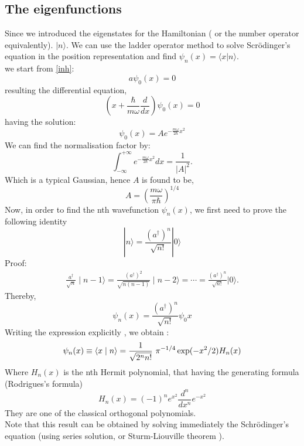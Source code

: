 \subsection{The eigenfunctions}
Since we introduced the eigenstates for the Hamiltonian ( or the number operator equivalently). $ | n\rangle$. We can use the ladder operator method to solve Scr\"{o}dinger's equation in the position representation and find $ \psi_n(x) = \langle x| n\rangle$. \\ we start from \eqref{inh}:
\begin{equation}
a \psi_0(x) =0
\end{equation}
resulting the differential equation,
\begin{equation}
\left( x+\frac{\hbar}{m \omega} \frac{d}{dx}\right)  \psi_0(x) =0
\end{equation}
having the solution:
\begin{equation}
\psi_0(x) = A e^{-\frac{m \omega}{2 \hbar} x^2}
\end{equation}
We can find the normalisation factor by:
\begin{equation}
\int_{- \infty}^{+ \infty} e^{-\frac{m \omega}{2 \hbar} x^2} dx = \frac{1}{|A|^2}.
\end{equation}
Which is a typical Gaussian, hence $A$ is found to be,
\begin{equation}
A= \left( \frac{m \omega}{\pi \hbar}\right) ^ {1/4}
\end{equation} 
Now, in order to find the nth wavefunction $ \psi_n(x)$, we first need to prove the following identity
\begin{equation}
| n\rangle = \frac{ (a^\dagger)^n}{\sqrt{n !}} | 0\rangle
\end{equation}
Proof:
\begin{align*}
\frac{a^\dagger}{\sqrt{n}} \mid n - 1 \rangle = \frac{(a^\dagger)^2}{\sqrt{n(n - 1)}}\mid n - 2 \rangle = \cdots = \frac{(a^\dagger)^n}{\sqrt{n!}}|0\rangle.
\end{align*}
Thereby, 
\begin{equation}
\psi_n(x) = \frac{ (a^\dagger)^n}{\sqrt{n !}} \psi_0{x}
\end{equation}
Writing the expression explicitly , we obtain :
\begin{equation}
\psi_n(x)\equiv \left\langle x \mid n \right\rangle = {1 \over \sqrt{2^n n!}}~ \pi^{-1/4} \exp(-x^2 / 2) H_n(x)
\end{equation}
Where $ H_n(x)$ is the nth Hermit polynomial, that having the generating formula (Rodrigues's formula)
\begin{equation}
H_n(x)=(-1)^n e^{x^2}\frac{d^n}{dx^n}e^{-x^2}
\end{equation}
They are one of the classical orthogonal polynomials. \\
Note that this result can be obtained by solving immediately the Schr\"{o}dinger's equation (using series solution, or Sturm-Liouville theorem ).
